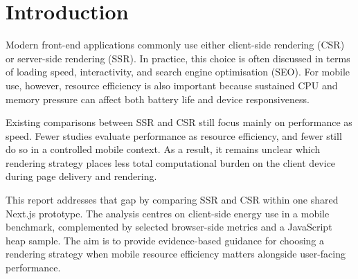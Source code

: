 \section{Introduction}

Modern front-end applications commonly use either client-side rendering (CSR) or server-side rendering (SSR). In practice, this choice is often discussed in terms of loading speed, interactivity, and search engine optimisation (SEO). For mobile use, however, resource efficiency is also important because sustained CPU and memory pressure can affect both battery life and device responsiveness.

Existing comparisons between SSR and CSR still focus mainly on performance as speed. Fewer studies evaluate performance as resource efficiency, and fewer still do so in a controlled mobile context. As a result, it remains unclear which rendering strategy places less total computational burden on the client device during page delivery and rendering.

This report addresses that gap by comparing SSR and CSR within one shared Next.js prototype. The analysis centres on client-side energy use in a mobile benchmark, complemented by selected browser-side metrics and a JavaScript heap sample. The aim is to provide evidence-based guidance for choosing a rendering strategy when mobile resource efficiency matters alongside user-facing performance.
